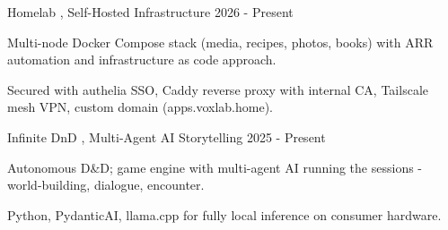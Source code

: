 \experienceheader
    {Homelab}
    {\small , Self-Hosted Infrastructure}
    {2026 - Present}
    {}
\begin{zitemize}
    \item Multi-node Docker Compose stack (media, recipes, photos, books) with ARR automation and infrastructure as code approach.
    \item Secured with authelia SSO, Caddy reverse proxy with internal CA, Tailscale mesh VPN, custom domain (apps.voxlab.home).
\end{zitemize}

\experienceheader
    {Infinite DnD}
    {\small , Multi-Agent AI Storytelling}
    {2025 - Present}
    {}
\begin{zitemize}
    \item Autonomous D\&D; game engine with multi-agent AI running the sessions - world-building, dialogue, encounter.
    \item Python, PydanticAI, llama.cpp for fully local inference on consumer hardware.
\end{zitemize}